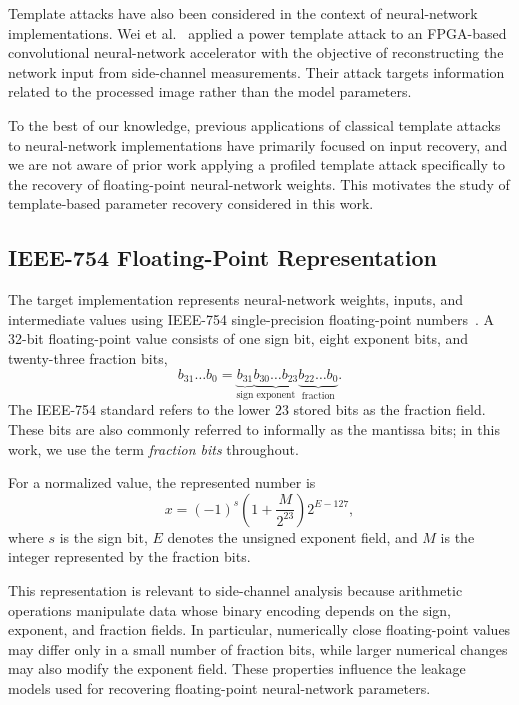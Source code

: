 \documentclass[conference]{IEEEtran}
\begin{document}
Template attacks have also been considered in the context of neural-network implementations.
Wei et al.~\cite{wei2018know} applied a power template attack to an FPGA-based convolutional neural-network accelerator with the objective of reconstructing the network input from side-channel measurements.
Their attack targets information related to the processed image rather than the model parameters.

To the best of our knowledge, previous applications of classical template attacks to neural-network implementations have primarily focused on input recovery, and we are not aware of prior work applying a profiled template attack specifically to the recovery of floating-point neural-network weights.
This motivates the study of template-based parameter recovery considered in this work.

\subsection{IEEE-754 Floating-Point Representation}
\label{sec:ieee754}

The target implementation represents neural-network weights, inputs, and intermediate values using IEEE-754 single-precision floating-point numbers~\cite{IEEE754}.
A 32-bit floating-point value consists of one sign bit, eight exponent bits, and twenty-three fraction bits,
\begin{equation*}
	b_{31}\ldots b_0 =
	\underbrace{b_{31}}_{\text{sign}}
	\underbrace{b_{30}\ldots b_{23}}_{\text{exponent}}
	\underbrace{b_{22}\ldots b_0}_{\text{fraction}}.
\end{equation*}
The IEEE-754 standard refers to the lower $23$ stored bits as the fraction field.
These bits are also commonly referred to informally as the mantissa bits; in this work, we use the term \emph{fraction bits} throughout.

For a normalized value, the represented number is
\begin{equation*}
	x =
	(-1)^s
	\left(
	1 + \frac{M}{2^{23}}
	\right)
	2^{E-127},
\end{equation*}
where $s$ is the sign bit, $E$ denotes the unsigned exponent field, and $M$ is the integer represented by the fraction bits.

This representation is relevant to side-channel analysis because arithmetic operations manipulate data whose binary encoding depends on the sign, exponent, and fraction fields.
In particular, numerically close floating-point values may differ only in a small number of fraction bits, while larger numerical changes may also modify the exponent field.
These properties influence the leakage models used for recovering floating-point neural-network parameters.
\end{document}
